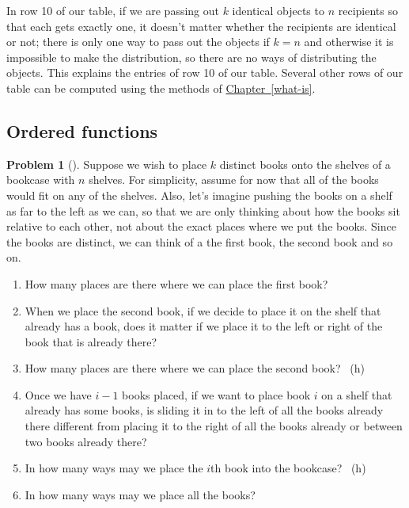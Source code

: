 \documentclass[10pt,]{book}
\theoremstyle{plain}
\theoremstyle{definition}
\newtheorem{activity}[project]{Problem}
\theoremstyle{definition}
\numberwithin{equation}{chapter}
\begin{document}
\par
\hypertarget{p-734}{}%
In row 10 of our table, if we are passing out \(k\) identical objects to \(n\) recipients so that each gets exactly one, it doesn't matter whether the recipients are identical or not; there is only one way to pass out the objects if \(k=n\) and otherwise it is impossible to make the distribution, so there are no ways of distributing the objects. This explains the entries of row 10 of our table. Several other rows of our table can be computed using the methods of \hyperref[what-is]{Chapter~\ref{what-is}}.%
\typeout{************************************************}
\typeout{************************************************}
\subsection[{Ordered functions}]{Ordered functions}\label{orderedfunctionsection}
\begin{activity}[]\marginsymbol[-1em]{} \label{bookcase}
\hypertarget{p-735}{}%
Suppose we wish to place \(k\) distinct books onto the shelves of a bookcase with \(n\) shelves. For simplicity, assume for now that all of the books would fit on any of the shelves. Also, let's imagine pushing the books on a shelf as far to the left as we can, so that we are only thinking about how the books sit relative to each other, not about the exact places where we put the books. Since the books are distinct, we can think of a the first book, the second book and so on.%
\begin{enumerate}[font=\bfseries,label=(\alph*),ref=\alph*]
\item\label{task-102} \marginsymbol[-2.5em]{} \hypertarget{p-736}{}%
How many places are there where we can place the first book?%
\item\label{task-103} \marginsymbol[-2.5em]{} \hypertarget{p-738}{}%
When we place the second book, if we decide to place it on the shelf that already has a book, does it matter if we place it to the left or right of the book that is already there?%
\item\label{task-104} \marginsymbol[-2.5em]{} \hypertarget{p-740}{}%
How many places are there where we can place the second book?%
~{\tiny (h)}\item\label{task-105} \marginsymbol[-2.5em]{} \hypertarget{p-743}{}%
Once we have \(i-1\) books placed, if we want to place book \(i\)  on a shelf that already has some books, is sliding it in to the left of all the books already there different from placing it to the right of all the books already or between two books already there?%
\item\label{task-106} \marginsymbol[-2.5em]{} \hypertarget{p-745}{}%
In how many ways may we place the \(i\)th book into the bookcase?%
~{\tiny (h)}\item\label{task-107} \marginsymbol[-2.5em]{} \hypertarget{p-748}{}%
In how many ways may we place all the books?%
\end{enumerate}
\end{activity}
\end{document}

